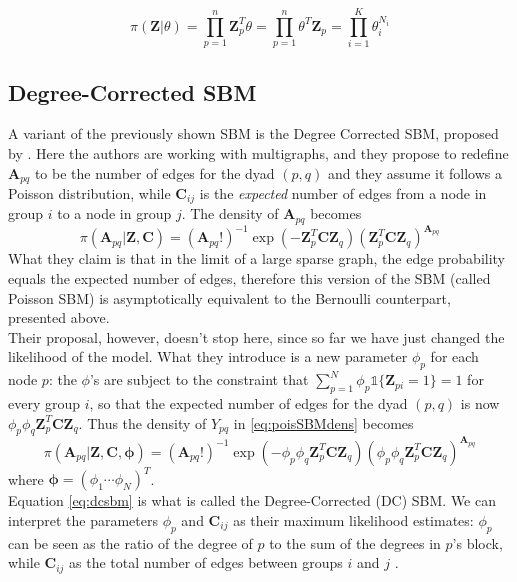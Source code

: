 \begin{equation}
    \pi(\mathbf{Z}|\theta) = \prod_{p=1}^n \mathbf{Z}_p^T \theta = \prod_{p=1}^n \theta^T \mathbf{Z}_p = \prod_{i=1}^K \theta^{N_i}_i
\end{equation}

\subsection{Degree-Corrected SBM}
A variant of the previously shown SBM is the Degree Corrected SBM, proposed by \textcite{karrer2011dcsbm}. Here the authors are working with multigraphs, and they propose to redefine $\mathbf{A}_{pq}$ to be the number of edges for the dyad $(p,q)$ and they assume it follows a Poisson distribution, while $\mathbf{C}_{ij}$ is the \textit{expected} number of edges from a node in group $i$ to a node in group $j$. The density of $\mathbf{A}_{pq}$ becomes
\begin{equation}\label{eq:poisSBMdens}
    \pi(\mathbf{A}_{pq}|\mathbf{Z,C}) = (\mathbf{A}_{pq}!)^{-1} \exp \left( -\mathbf{Z}^T_p \mathbf{C} \mathbf{Z}_q \right) \left( \mathbf{Z}^T_p \mathbf{C} \mathbf{Z}_q \right)^{\mathbf{A}_{pq}}
\end{equation}
What they claim is that in the limit of a large sparse graph, the edge probability equals the expected number of edges, therefore this version of the SBM (called Poisson SBM) is asymptotically equivalent to the Bernoulli counterpart, presented above.\\
Their proposal, however, doesn't stop here, since so far we have just changed the likelihood of the model. What they introduce is a new parameter $\phi_p$ for each node $p$: the $\phi$'s are subject to the constraint that $\sum_{p=1}^N \phi_p \mathbb{1}\{\mathbf{Z}_{pi} = 1\} = 1$ for every group $i$, so that the expected number of edges for the dyad $(p,q)$ is now $\phi_p \phi_q \mathbf{Z}^T_p \mathbf{C} \mathbf{Z}_q$. Thus the density of $Y_{pq}$ in \ref{eq:poisSBMdens} becomes
\begin{equation}\label{eq:dcsbm}
    \pi(\mathbf{A}_{pq}|\mathbf{Z,C,\phi}) = (\mathbf{A}_{pq}!)^{-1} \exp \left( -\phi_p \phi_q \mathbf{Z}^T_p \mathbf{C} \mathbf{Z}_q \right) \left(\phi_p \phi_q \mathbf{Z}^T_p \mathbf{C} \mathbf{Z}_q \right)^{\mathbf{A}_{pq}}
\end{equation}
where $\mathbf{\phi} = (\phi_1 \cdots \phi_N)^T$.\\
Equation \ref{eq:dcsbm} is what is called the Degree-Corrected (DC) SBM. We can interpret the parameters $\phi_p$ and $\mathbf{C}_{ij}$ as their maximum likelihood estimates: $\phi_p$ can be seen as the ratio of the degree of $p$ to the sum of the degrees in $p$'s block, while $\mathbf{C}_{ij}$ as the total number of edges between groups $i$ and $j$ \cite{lee2019review}.
